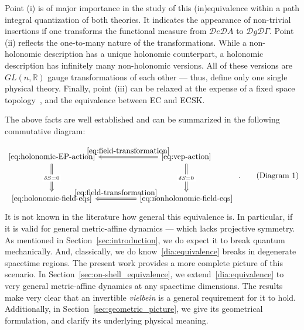 \documentclass[../../main.tex]{subfiles}
\begin{document}
Point (i) is of major importance in the study of this (in)equivalence within a path integral quantization of both theories. It indicates the appearance of non-trivial insertions if one transforms the functional measure from $\mathcal{D}e\mathcal{D}A$ to $\mathcal{D}g\mathcal{D}\Gamma$. Point (ii) reflects the one-to-many nature of the  transformations. While a non-holonomic description has a unique holonomic counterpart, a holonomic description has infinitely many non-holonomic versions. All of these versions are $GL\left(n,\mathbb{R}\right)$ gauge transformations of each other --- thus, define only one single physical theory. Finally, point (iii) can be relaxed at the expense of a fixed space topology~\cite{geroch1967,tipler1977,horowitz1991,borde1994,borde1999,heveling2022}, and the equivalence between EC and ECSK\@.

The above facts are well established and can be summarized in the following commutative diagram:

\begin{equation}\label{dia:equivalence}
  \begin{tikzcd}[row sep=huge, column sep=huge]
    \text{\eqref{eq:holonomic-EP-action}} \arrow[d, Rightarrow, "\delta S = 0" description]
    \arrow[r, Leftarrow, "\eqref{eq:field-transformation}"]
    &
    \text{\eqref{eq:vep-action}} \arrow[d, Rightarrow, "\delta S =0" description]
    \\
    \text{\eqref{eq:holonomic-field-eqs}}
    \arrow[r, Leftarrow, "\eqref{eq:field-transformation}"]
    &
    \text{\eqref{eq:nonholonomic-field-eqs}}
  \end{tikzcd} \;. \tag{Diagram 1}
\end{equation}
It is not known in the literature how general this equivalence is. In particular, if it is valid for general metric-affine dynamics --- which lacks projective symmetry. As mentioned in Section~\ref{sec:introduction}, we do expect it to break quantum mechanically. And, classically, we do know~\ref{dia:equivalence} breaks in degenerate spacetime regions. The present work provides a more complete picture of this scenario. In Section~\ref{sec:on-shell_equivalence}, we extend~\ref{dia:equivalence} to very general metric-affine dynamics at any spacetime dimensions. The results make very clear that an invertible \textit{vielbein} is a general requirement for it to hold. Additionally, in Section~\ref{sec:geometric_picture}, we give its geometrical formulation, and clarify its underlying physical meaning.
\end{document}
